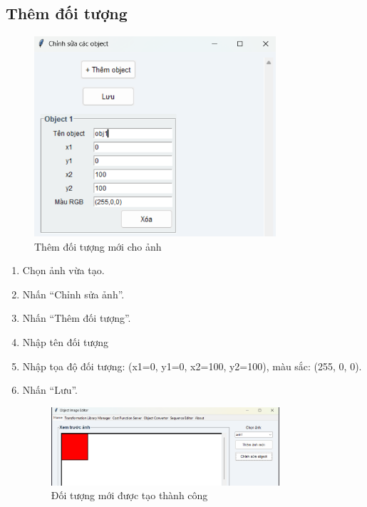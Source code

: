 \documentclass[a4paper,12pt]{article}
\begin{document}
\subsection{Thêm đối tượng}
\begin{figure}[H]
    \centering
    \includegraphics[width=0.8\textwidth]{addObj.png}
    \caption{Thêm đối tượng mới cho ảnh}
    \label{fig:tlm_tab}
    \end{figure}
\begin{enumerate}
    \item Chọn ảnh vừa tạo.
    \item Nhấn “Chỉnh sửa ảnh”.
    \item Nhấn “Thêm đối tượng”.
    \item Nhập tên đối tượng
    \item Nhập tọa độ đối tượng: (x1=0, y1=0, x2=100, y2=100), màu sắc: (255, 0, 0).
    \item Nhấn “Lưu”.
    \begin{figure}[H]
    \centering
    \includegraphics[width=0.8\textwidth]{affterSaveObj.png}
    \caption{Đối tượng mới được tạo thành công}
    \label{fig:tlm_tab}
    \end{figure}
\end{enumerate}
\end{document}
